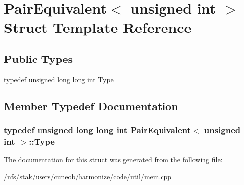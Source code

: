 \hypertarget{structPairEquivalent_3_01unsigned_01int_01_4}{\section{Pair\-Equivalent$<$ unsigned int $>$ Struct Template Reference}
\label{structPairEquivalent_3_01unsigned_01int_01_4}
}
\subsection*{Public Types}
\begin{DoxyCompactItemize}
\item 
typedef unsigned long long int \hyperlink{structPairEquivalent_3_01unsigned_01int_01_4_ab0f1ee99113d70abd929ea4f5610bfa7}{Type}
\end{DoxyCompactItemize}


\subsection{Member Typedef Documentation}
\hypertarget{structPairEquivalent_3_01unsigned_01int_01_4_ab0f1ee99113d70abd929ea4f5610bfa7}{
\subsubsection[{Type}]{\setlength{\rightskip}{0pt plus 5cm}typedef unsigned long long int {\bf Pair\-Equivalent}$<$ unsigned int $>$\-::{\bf Type}}}\label{structPairEquivalent_3_01unsigned_01int_01_4_ab0f1ee99113d70abd929ea4f5610bfa7}


The documentation for this struct was generated from the following file\-:\begin{DoxyCompactItemize}
\item 
/nfs/stak/users/cuneob/harmonize/code/util/\hyperlink{mem_8cpp}{mem.\-cpp}\end{DoxyCompactItemize}
